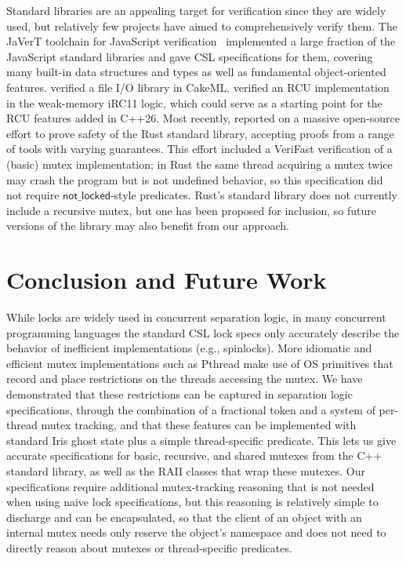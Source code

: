 \documentclass[acmsmall,screen,review,anonymous]{acmart}
\begin{document}
Standard libraries are an appealing target for verification since they are widely used, but relatively few projects have aimed to comprehensively verify them. The JaVerT toolchain for JavaScript verification~\cite{javert} implemented a large fraction of the JavaScript standard libraries and gave CSL specifications for them, covering many built-in data structures and types as well as fundamental object-oriented features. \citet{cakeml-io} verified a file I/O library in CakeML. \citet{irc11-rcu} verified an RCU implementation in the weak-memory iRC11 logic, which could serve as a starting point for the RCU features added in C++26. Most recently, \citet{rust-stdlib} reported on a massive open-source effort to prove safety of the Rust standard library, accepting proofs from a range of tools with varying guarantees. This effort included a VeriFast verification of a (basic) mutex implementation; in Rust the same thread acquiring a mutex twice may crash the program but is not undefined behavior, so this specification did not require $\mathsf{not\_locked}$-style predicates. Rust's standard library does not currently include a recursive mutex, but one has been proposed for inclusion, so future versions of the library may also benefit from our approach.

\section{Conclusion and Future Work}
While locks are widely used in concurrent separation logic, in many concurrent programming languages the standard CSL lock specs only accurately describe the behavior of inefficient implementations (e.g., spinlocks). More idiomatic and efficient mutex implementations such as Pthread make use of OS primitives that record and place restrictions on the threads accessing the mutex. We have demonstrated that these restrictions can be captured in separation logic specifications, through the combination of a fractional token and a system of per-thread mutex tracking, and that these features can be implemented with standard Iris ghost state plus a simple thread-specific predicate. This lets us give accurate specifications for basic, recursive, and shared mutexes from the C++ standard library, as well as the RAII classes that wrap these mutexes. Our specifications require additional mutex-tracking reasoning that is not needed when using naive lock specifications, but this reasoning is relatively simple to discharge and can be encapsulated, so that the client of an object with an internal mutex needs only reserve the object's namespace and does not need to directly reason about mutexes or thread-specific predicates.
\end{document}
